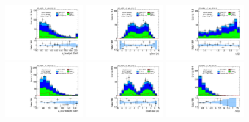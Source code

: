 \clearpage

\begin{figure}[tp]
  \centering
  \includegraphics[width=0.30\textwidth]{figures/analysis/vbf-topCR/jet-1-pt}
  \includegraphics[width=0.30\textwidth]{figures/analysis/vbf-topCR/jet-1-eta}
  \includegraphics[width=0.30\textwidth]{figures/analysis/vbf-topCR/jets-dphi} \\
  \includegraphics[width=0.30\textwidth]{figures/analysis/vbf-topCR/jet-2-pt}
  \includegraphics[width=0.30\textwidth]{figures/analysis/vbf-topCR/jet-2-eta}
  \includegraphics[width=0.30\textwidth]{figures/analysis/vbf-topCR/jets-deta} \\

\end{figure}
